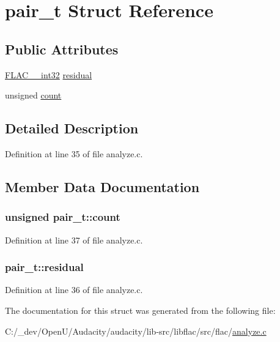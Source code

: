 \hypertarget{structpair__t}{}\section{pair\+\_\+t Struct Reference}
\label{structpair__t}
\subsection*{Public Attributes}
\begin{DoxyCompactItemize}
\item 
\hyperlink{ordinals_8h_a33fd77bfe6d685541a0c034a75deccdc}{F\+L\+A\+C\+\_\+\+\_\+int32} \hyperlink{structpair__t_a9ceb63a056972261393c548ec60d5779}{residual}
\item 
unsigned \hyperlink{structpair__t_ae0f44bb23f7c75afbc7601438b0525d3}{count}
\end{DoxyCompactItemize}


\subsection{Detailed Description}


Definition at line 35 of file analyze.\+c.



\subsection{Member Data Documentation}
\subsubsection[{\texorpdfstring{count}{count}}]{\setlength{\rightskip}{0pt plus 5cm}unsigned pair\+\_\+t\+::count}\hypertarget{structpair__t_ae0f44bb23f7c75afbc7601438b0525d3}{}\label{structpair__t_ae0f44bb23f7c75afbc7601438b0525d3}


Definition at line 37 of file analyze.\+c.

\subsubsection[{\texorpdfstring{residual}{residual}}]{ pair\+\_\+t\+::residual}\hypertarget{structpair__t_a9ceb63a056972261393c548ec60d5779}{}\label{structpair__t_a9ceb63a056972261393c548ec60d5779}


Definition at line 36 of file analyze.\+c.



The documentation for this struct was generated from the following file\+:\begin{DoxyCompactItemize}
\item 
C\+:/\+\_\+dev/\+Open\+U/\+Audacity/audacity/lib-\/src/libflac/src/flac/\hyperlink{analyze_8c}{analyze.\+c}\end{DoxyCompactItemize}
